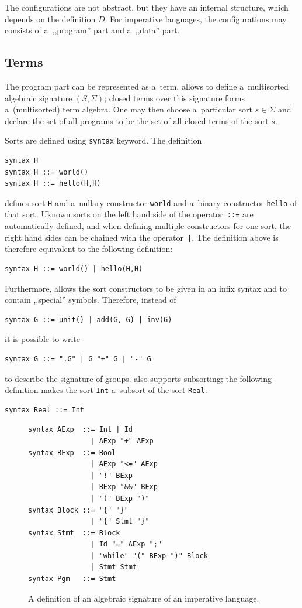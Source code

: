 \documentclass{fithesis3}
\newcommand{\var}[1]{\mathit{#1}\xspace}
\begin{document}

The configurations are not abstract, but they have an internal structure, which depends on the definition $\var{D}$. 
For imperative languages, the configurations may consists of a~,,program'' part and a~,,data'' part.

\subsection{Terms}

The program part can be represented as a~term. \K allows to define a~multisorted algebraic signature $(S, \Sigma)$; closed terms over this signature forms a~(multisorted) term algebra. One may then choose a~particular sort $s \in \Sigma$ and declare the set of all programs to be the set of all closed terms of the sort $s$.

Sorts are defined using \texttt{syntax} keyword. The definition
\begin{lstlisting}
syntax H
syntax H ::= world()
syntax H ::= hello(H,H)
\end{lstlisting}
defines sort \texttt{H} and a~nullary constructor \texttt{world} and a~binary constructor \texttt{hello} of that sort. Uknown sorts on the left hand side of the operator~\texttt{::=} are automatically defined, and when defining multiple constructors for one sort, the right hand sides can be chained with the operator~\texttt{|}. The definition above is therefore equivalent to the following definition:
\begin{lstlisting}
syntax H ::= world() | hello(H,H)
\end{lstlisting}
Furthermore, \K allows the sort constructors to be given in an infix syntax and to contain ,,special'' symbols. Therefore, instead of
\begin{lstlisting}
syntax G ::= unit() | add(G, G) | inv(G)
\end{lstlisting}
it is possible to write
\begin{lstlisting}
syntax G ::= ".G" | G "+" G | "-" G
\end{lstlisting}
to describe the signature of groups. \K also supports subsorting; the following definition makes the sort \texttt{Int} a~subsort of the sort \texttt{Real}:
\begin{lstlisting}
syntax Real ::= Int
\end{lstlisting}

\begin{figure}[ht]
\begin{lstlisting}
syntax AExp  ::= Int | Id
               | AExp "+" AExp
syntax BExp  ::= Bool
               | AExp "<=" AExp
               | "!" BExp
               | BExp "&&" BExp
               | "(" BExp ")"
syntax Block ::= "{" "}"
               | "{" Stmt "}"
syntax Stmt  ::= Block
               | Id "=" AExp ";"
               | "while" "(" BExp ")" Block
               | Stmt Stmt
syntax Pgm   ::= Stmt
\end{lstlisting}
\caption{A definition of an algebraic signature of an imperative language.}
\label{impSyntax}
\end{figure}
\end{document}
